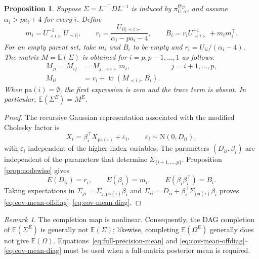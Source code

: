 \documentclass[12pt]{article}
\DeclareMathOperator{\tr}{tr}
\newcommand{\D}{\mathcal{D}}
\theoremstyle{plain}
\newtheorem{proposition}[theorem]{Proposition}
\theoremstyle{definition}
\theoremstyle{remark}
\newtheorem{Rem}[theorem]{Remark}
\begin{document}
\begin{proposition}\label{exofsigma}
Suppose \(\Sigma=L^{-\top}DL^{-1}\) is induced by
\(\pi^{\Theta_{\D}}_{U,\alpha}\), and assume
\(\alpha_i>pa_i+4\) for every \(i\).  Define
\[
m_i=U_{\prec i\succ}^{-1}U_{\prec i]},
\qquad
r_i=\frac{U_{ii\mid\prec i\succ}}{\alpha_i-pa_i-4},
\qquad
B_i=r_iU_{\prec i\succ}^{-1}+m_im_i^\top .
\]
For an empty parent set, take \(m_i\) and \(B_i\) to be empty and
\(r_i=U_{ii}/(\alpha_i-4)\).  The matrix
\(M=\mathbb{E}(\Sigma)\) is obtained for \(i=p,p-1,\ldots,1\) as
follows:
\begin{align}
M_{ji}=M_{ij}
  &=M_{j,\prec i\succ}m_i,
  &&j=i+1,\ldots,p,\label{eq:cov-mean-offdiag}\\
M_{ii}
  &=r_i+\tr\!\left(M_{\prec i\succ}B_i\right).
  \label{eq:cov-mean-diag}
\end{align}
When \(\mathrm{pa}(i)=\emptyset\), the first expression is zero and the
trace term is absent.  In particular,
\(\mathbb{E}(\Sigma^E)=M^E\).
\end{proposition}

\begin{proof}
The recursive Gaussian representation associated with the modified
Cholesky factor is
\[
X_i=\beta_i^\top X_{\mathrm{pa}(i)}+\varepsilon_i,
\qquad
\varepsilon_i\sim\mathrm{N}(0,D_{ii}),
\]
with \(\varepsilon_i\) independent of the higher-index variables.
The parameters \((D_{ii},\beta_i)\) are independent of the parameters
that determine \(\Sigma_{\{i+1,\ldots,p\}}\).  Proposition
\ref{prop:nodewise} gives
\[
E(D_{ii})=r_i,\qquad
E(\beta_i)=m_i,\qquad
E(\beta_i\beta_i^\top)=B_i.
\]
Taking expectations in
\(\Sigma_{ji}=\Sigma_{j,\mathrm{pa}(i)}\beta_i\) and
\(\Sigma_{ii}=D_{ii}+
\beta_i^\top\Sigma_{\mathrm{pa}(i)}\beta_i\) proves
\eqref{eq:cov-mean-offdiag}--\eqref{eq:cov-mean-diag}.
\end{proof}

\begin{Rem}\label{rem:expectation-completion}
The completion map is nonlinear.  Consequently, the DAG completion of
\(\mathbb{E}(\Sigma^E)\) is generally not \(\mathbb{E}(\Sigma)\);
likewise, completing \(\mathbb{E}(\Omega^E)\) generally does not give
\(\mathbb{E}(\Omega)\).  Equations~\eqref{eq:full-precision-mean} and
\eqref{eq:cov-mean-offdiag}--\eqref{eq:cov-mean-diag} must be used when
a full-matrix posterior mean is required.
\end{Rem}

\end{document}
